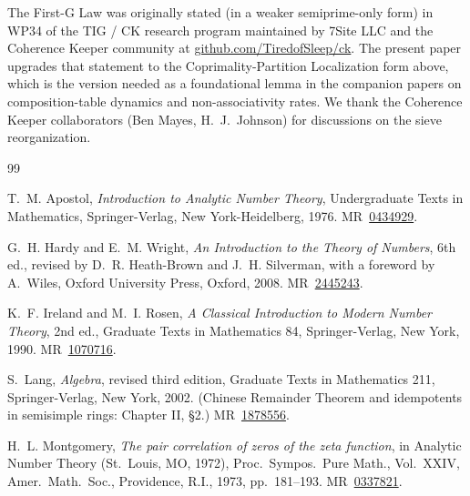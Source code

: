 \documentclass[11pt,reqno]{amsart}
\theoremstyle{definition}
\begin{document}
The First-G Law was originally stated (in a weaker semiprime-only form)
in WP34 \cite{WP34} of the TIG / CK research program maintained by 7Site
LLC and the Coherence Keeper community at
\href{https://github.com/TiredofSleep/ck}{github.com/TiredofSleep/ck}. The
present paper upgrades that statement to the Coprimality-Partition
Localization form above, which is the version needed as a foundational
lemma in the companion papers \cite{WP35,WP101} on composition-table
dynamics and non-associativity rates. We thank the Coherence Keeper
collaborators (Ben Mayes, H.~J.~Johnson) for discussions on the sieve
reorganization.

\begin{thebibliography}{99}

T.~M. Apostol, \emph{Introduction to Analytic Number Theory}, Undergraduate
Texts in Mathematics, Springer-Verlag, New York-Heidelberg, 1976.
\textsc{MR}~\href{https://mathscinet.ams.org/mathscinet-getitem?mr=0434929}{0434929}.

G.~H. Hardy and E.~M. Wright, \emph{An Introduction to the Theory of
Numbers}, 6th ed., revised by D.~R. Heath-Brown and J.~H. Silverman, with
a foreword by A.~Wiles, Oxford University Press, Oxford, 2008.
\textsc{MR}~\href{https://mathscinet.ams.org/mathscinet-getitem?mr=2445243}{2445243}.

K.~F. Ireland and M.~I. Rosen, \emph{A Classical Introduction to Modern
Number Theory}, 2nd ed., Graduate Texts in Mathematics 84, Springer-Verlag,
New York, 1990.
\textsc{MR}~\href{https://mathscinet.ams.org/mathscinet-getitem?mr=1070716}{1070716}.

S.~Lang, \emph{Algebra}, revised third edition, Graduate Texts in
Mathematics 211, Springer-Verlag, New York, 2002. (Chinese Remainder
Theorem and idempotents in semisimple rings: Chapter II, \S 2.)
\textsc{MR}~\href{https://mathscinet.ams.org/mathscinet-getitem?mr=1878556}{1878556}.

H.~L. Montgomery, \emph{The pair correlation of zeros of the zeta function},
in Analytic Number Theory (St.~Louis, MO, 1972), Proc.~Sympos.~Pure Math.,
Vol.~XXIV, Amer.\ Math.\ Soc., Providence, R.I., 1973, pp.~181--193.
\textsc{MR}~\href{https://mathscinet.ams.org/mathscinet-getitem?mr=0337821}{0337821}.


\end{thebibliography}
\end{document}
